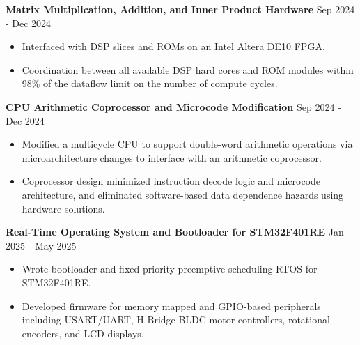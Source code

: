 \documentclass[10pt,letterpaper]{article}
\newcommand{\tightlist}{%
  \setlength{\itemsep}{0pt}%
  \setlength{\leftmargin}{1.0em}%
  \setlength{\parskip}{0pt}%
  \setlength{\topsep}{1.5pt}%
  \setlength{\parsep}{0pt}%
}
\newlength{\cvkeepskip}
\newcommand{\cvkeep}[1]{%
  \begingroup
    \setlength{\cvkeepskip}{#1}%
    \ifdim\pagegoal<\maxdimen
      \addtolength{\cvkeepskip}{\pagetotal}%
      \ifdim\cvkeepskip>\pagegoal
        \newpage
      \fi
    \fi
  \endgroup
}
\newcommand{\entrysep}{\vspace{2pt}\cvkeep{140pt}}
\newcommand{\cvwhen}[1]{\textsf{#1}}%
\begin{document}
\entrysep
\textbf{Matrix Multiplication, Addition, and Inner Product Hardware} \hfill
\cvwhen{Sep 2024 - Dec 2024}
\begin{itemize}\tightlist
  \item Interfaced with DSP slices and ROMs on an Intel Altera DE10 FPGA.
  \item Coordination between all available DSP hard cores and ROM modules
    within 98\% of the dataflow limit on the number of compute cycles.
\end{itemize}

\entrysep
\textbf{CPU Arithmetic Coprocessor and Microcode Modification} \hfill
\cvwhen{Sep 2024 - Dec 2024}
\begin{itemize}\tightlist
  \item Modified a multicycle CPU to support double-word arithmetic operations
    via microarchitecture changes to interface with an arithmetic coprocessor.
  \item Coprocessor design minimized instruction decode logic and microcode
    architecture, and eliminated software-based data dependence hazards using
    hardware solutions.
\end{itemize}

\entrysep
\textbf{Real-Time Operating System and Bootloader for STM32F401RE} \hfill
\cvwhen{Jan 2025 - May 2025}
\begin{itemize}\tightlist
  \item Wrote bootloader and fixed priority preemptive scheduling RTOS for
    STM32F401RE.
  \item Developed firmware for memory mapped and GPIO-based peripherals
    including USART/UART, H-Bridge BLDC motor controllers, rotational encoders,
    and LCD displays.
\end{itemize}
\end{document}
